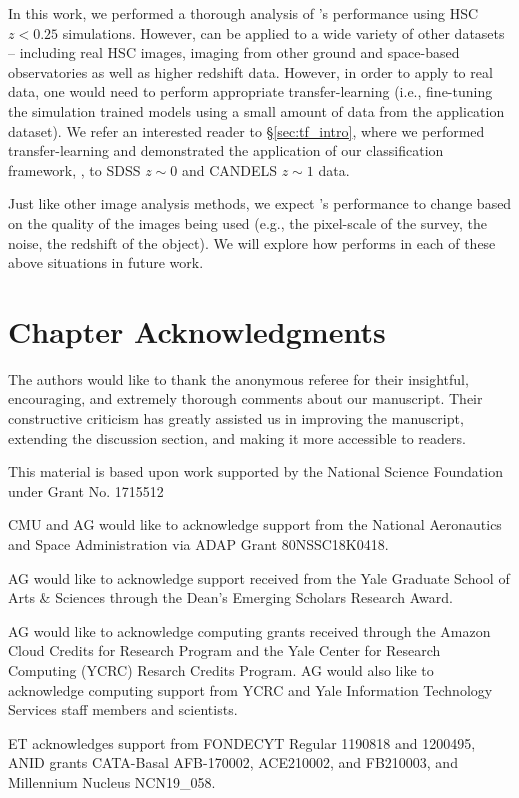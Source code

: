 In this work, we performed a thorough analysis of \gampen{}'s performance using HSC $z < 0.25$ simulations. However, \gampen{} can be applied to a wide variety of other datasets -- including real HSC images, imaging from other ground and space-based observatories as well as higher redshift data. However, in order to apply \gampen{} to real data, one would need to perform appropriate transfer-learning (i.e., fine-tuning the simulation trained \gampen{} models using a small amount of data from the application dataset). We refer an interested reader to \S \ref{sec:tf_intro}, where we performed transfer-learning and demonstrated the application of our classification framework, \gamornet{}, to SDSS $z\sim0$ and CANDELS $z\sim1$ data.
    
Just like other image analysis methods, we expect \gampen{}'s performance to change based on the quality of the images being used (e.g., the pixel-scale of the survey, the noise, the redshift of the object). We will explore how \gampen{} performs in each of these above situations in future work.

\section*{Chapter Acknowledgments}

The authors would like to thank the anonymous referee for their insightful, encouraging, and extremely thorough comments about our manuscript.  Their constructive criticism has greatly assisted us in improving the manuscript, extending the discussion section, and making it more accessible to readers.

This material is based upon work supported by the National Science Foundation under Grant No. 1715512

CMU and AG would like to acknowledge support from the National Aeronautics and Space Administration via ADAP Grant 80NSSC18K0418. 

AG would like to acknowledge support received from the Yale Graduate School of Arts \& Sciences through the Dean's Emerging Scholars Research Award.

AG would like to acknowledge computing grants received through the Amazon Cloud Credits for Research Program and the Yale Center for Research Computing (YCRC) Resarch Credits Program. AG would also like to acknowledge computing support from YCRC and Yale Information Technology Services staff members and scientists. 

ET acknowledges support from FONDECYT Regular 1190818 and 1200495, ANID grants CATA-Basal AFB-170002, ACE210002, and FB210003, and Millennium Nucleus NCN19\_058.

